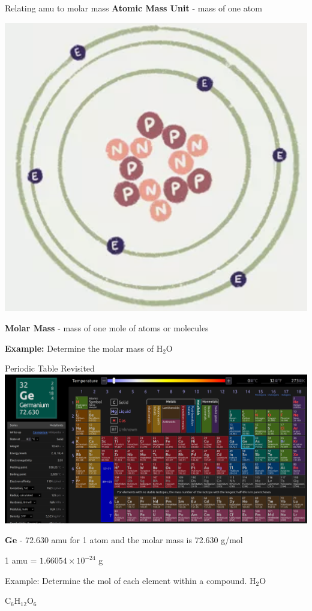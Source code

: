 \documentclass[11pt]{beamer}
\begin{document}
\begin{frame}{Relating amu to molar mass}
  \textbf{Atomic Mass Unit} - mass of one atom

  \begin{center}
    \includegraphics[width=0.25\linewidth]{atomic_mass}
  \end{center}

  \textbf{Molar Mass} - mass of one mole of atoms or molecules

  \textbf{Example:} Determine the molar mass of H$_2$O
  
  \centering
\end{frame}

\begin{frame}{Periodic Table Revisited}
  \centering
  \includegraphics[width=\linewidth]{ptable}

  \textbf{Ge} - 72.630 amu for 1 atom and the molar mass is 72.630 g/mol

  1 amu = $1.66054\times 10^{-24}$ g
\end{frame}

\begin{frame}{Example: Determine the mol of each element within a compound.}
  H$_2$O 
  
  C$_6$H$_{12}$O$_6$ 

\end{frame}
\end{document}
